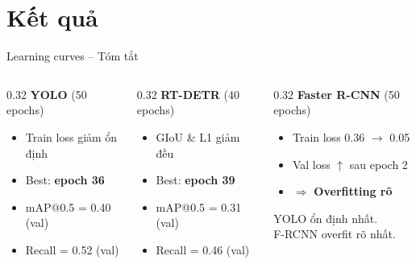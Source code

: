 \section{Kết quả}

\begin{frame}{Learning curves -- Tóm tắt}

\begin{columns}[T]
\begin{column}{0.32\textwidth}
  \textbf{YOLO} (50 epochs)
  \begin{itemize}\small
    \item Train loss giảm ổn định
    \item Best: \textbf{epoch 36}
    \item mAP@0.5 = 0.40 (val)
    \item Recall = 0.52 (val)
  \end{itemize}
\end{column}
\begin{column}{0.32\textwidth}
  \textbf{RT-DETR} (40 epochs)
  \begin{itemize}\small
    \item GIoU \& L1 giảm đều
    \item Best: \textbf{epoch 39}
    \item mAP@0.5 = 0.31 (val)
    \item Recall = 0.46 (val)
  \end{itemize}
\end{column}
\begin{column}{0.32\textwidth}
  \textbf{Faster R-CNN} (50 epochs)
  \begin{itemize}\small
    \item Train loss 0.36 $\to$ 0.05
    \item Val loss $\uparrow$ sau epoch 2
    \item $\Rightarrow$ \textbf{Overfitting rõ}
  \end{itemize}
  \vspace{0.3em}
  \begin{alertblock}{}\scriptsize
    YOLO ổn định nhất.\\F-RCNN overfit rõ nhất.
  \end{alertblock}
\end{column}
\end{columns}

\end{frame}

